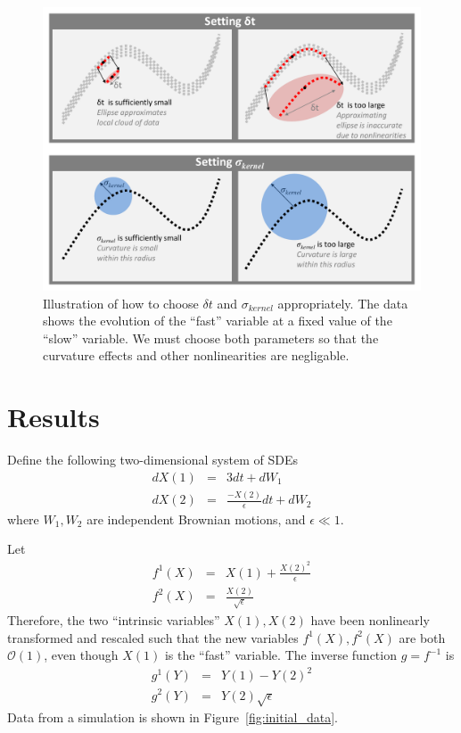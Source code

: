 \documentclass[1p]{elsarticle}
\begin{document}
\begin{figure}
\includegraphics[width=\textwidth]{schematic}
\caption{Illustration of how to choose $\delta t$ and $\sigma_{kernel}$ appropriately. The data shows the evolution of the ``fast'' variable at a fixed value of the ``slow'' variable.  We must choose both parameters so that the curvature effects and other nonlinearities are negligable. }
\label{fig:schematic}
\end{figure}

\section{Results}
 
Define the following two-dimensional system of SDEs
\begin{eqnarray} \label{eq:init_data}
dX(1) &=& 3 dt + dW_1 \\ 
dX(2) &=& \frac{-X(2)}{\epsilon} dt + dW_2 
\end{eqnarray}
where $W_1, W_2$ are independent Brownian motions, and $\epsilon \ll 1$.
%

Let
\begin{eqnarray}\label{eq:transformed_data}
f^1(X) &=& X(1) + \frac{ X(2)^2}{\epsilon} \\
f^2(X) &=& \frac{X(2)}{\sqrt{\epsilon}}
\end{eqnarray}
Therefore, the two ``intrinsic variables'' $X(1), X(2)$ have been nonlinearly transformed and rescaled such that the new variables $f^1(X), f^2(X)$ are both $\mathcal{O}(1)$, even though $X(1)$ is the ``fast'' variable. 
%
The inverse function $g = f^{-1}$ is
\begin{eqnarray}
g^1(Y) &=& Y(1) - Y(2)^2 \\
g^2(Y) &=& Y(2) \sqrt{\epsilon}
\end{eqnarray}
%
Data from a simulation is shown in Figure~\ref{fig:initial_data}.
\end{document}

